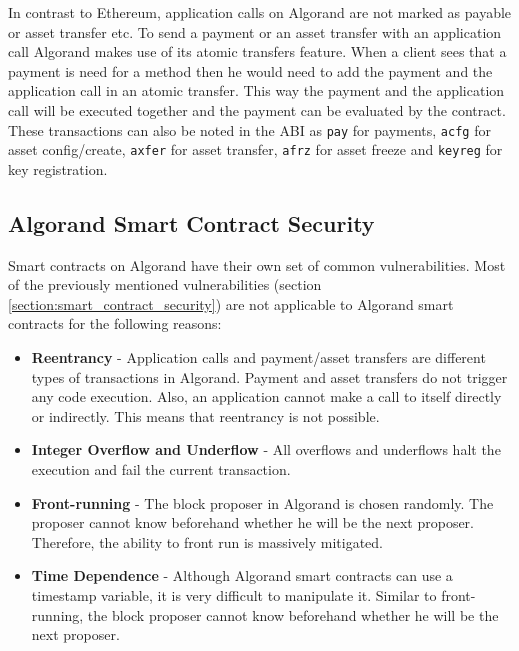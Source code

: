 In contrast to Ethereum, application calls on Algorand are not marked as payable or asset transfer etc. To send a payment or an asset transfer with an application call Algorand makes use of its atomic transfers feature. When a client sees that a payment is need for a method then he would need to add the payment and the application call in an atomic transfer. This way the payment and the application call will be executed together and the payment can be evaluated by the contract. These transactions can also be noted in the \ac{ABI} as \texttt{pay} for payments, \texttt{acfg} for asset config/create, \texttt{axfer} for asset transfer, \texttt{afrz} for asset freeze and \texttt{keyreg} for key registration.


\subsection*{Algorand Smart Contract Security} \label{section:algorand-smartcontracts-security}
Smart contracts on Algorand have their own set of common vulnerabilities. Most of the previously mentioned vulnerabilities (section \ref{section:smart_contract_security}) are not applicable to Algorand smart contracts for the following reasons:
\begin{itemize}
    \item \textbf{Reentrancy} - Application calls and payment/asset transfers are different types of transactions in Algorand. Payment and asset transfers do not trigger any code execution. Also, an application cannot make a call to itself directly or indirectly. This means that reentrancy is not possible.
    \item \textbf{Integer Overflow and Underflow} - All overflows and underflows halt the execution and fail the current transaction.
    \item \textbf{Front-running} - The block proposer in Algorand is chosen randomly. The proposer cannot know beforehand whether he will be the next proposer. Therefore, the ability to front run is massively mitigated.
    \item \textbf{Time Dependence} - Although Algorand smart contracts can use a timestamp variable, it is very difficult to manipulate it. Similar to front-running, the block proposer cannot know beforehand whether he will be the next proposer.
\end{itemize}

